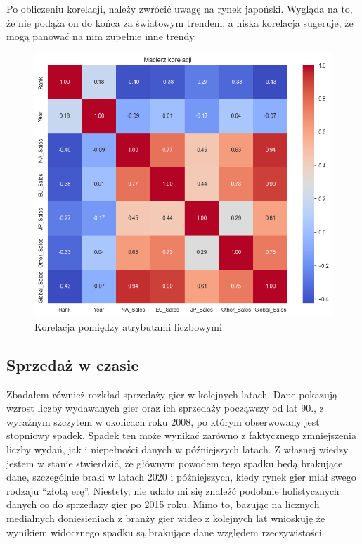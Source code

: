 \documentclass[11pt]{article}
\begin{document}
Po obliczeniu korelacji, należy zwrócić uwagę na rynek japoński.
Wygląda na to, że nie podąża on do końca za światowym trendem,
a niska korelacja sugeruje, że mogą panować na nim zupełnie inne trendy.

\begin{figure}[H]
    \centering
    \includegraphics{figures/korelacje}
    \caption{Korelacja pomiędzy atrybutami liczbowymi}
    \label{fig:korelacje}
\end{figure}

\subsection{Sprzedaż w czasie}\label{subsec:sprzedaz-w-czasie}

Zbadałem również rozkład sprzedaży gier w kolejnych latach.
Dane pokazują wzrost liczby wydawanych gier oraz ich sprzedaży począwszy od lat 90.,
z wyraźnym szczytem w okolicach roku 2008, po którym obserwowany jest stopniowy spadek.
Spadek ten może wynikać zarówno z faktycznego zmniejszenia liczby wydań, jak i niepełności danych w późniejszych latach.
Z własnej wiedzy jestem w stanie stwierdzić, że głównym powodem tego spadku będą brakujące dane,
szczególnie braki w latach 2020 i późniejszych, kiedy rynek gier miał swego rodzaju ``złotą erę''.
Niestety, nie udało mi się znaleźć podobnie holistycznych danych co do sprzedaży gier po 2015 roku.
Mimo to, bazując na licznych medialnych doniesieniach z branży gier wideo z kolejnych lat wnioskuję że wynikiem widocznego spadku są brakujące dane względem rzeczywistości.
\end{document}
